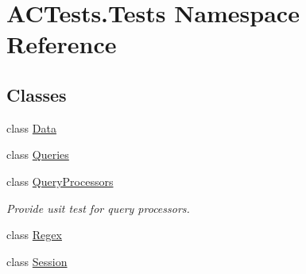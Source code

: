 \hypertarget{namespace_a_c_tests_1_1_tests}{}\section{A\+C\+Tests.\+Tests Namespace Reference}
\label{namespace_a_c_tests_1_1_tests}
\subsection*{Classes}
\begin{DoxyCompactItemize}
\item 
class \mbox{\hyperlink{class_a_c_tests_1_1_tests_1_1_data}{Data}}
\item 
class \mbox{\hyperlink{class_a_c_tests_1_1_tests_1_1_queries}{Queries}}
\item 
class \mbox{\hyperlink{class_a_c_tests_1_1_tests_1_1_query_processors}{Query\+Processors}}
\begin{DoxyCompactList}\small\item\em Provide usit test for query processors. \end{DoxyCompactList}\item 
class \mbox{\hyperlink{class_a_c_tests_1_1_tests_1_1_regex}{Regex}}
\item 
class \mbox{\hyperlink{class_a_c_tests_1_1_tests_1_1_session}{Session}}
\end{DoxyCompactItemize}
